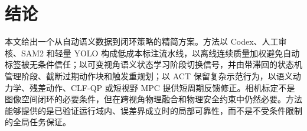 \documentclass[UTF8,a4paper,11pt]{ctexart}
\begin{document}
\section{结论}

本文给出一个从自动语义数据到闭环策略的精简方案。方法以 Codex、人工审核、SAM2 和轻量 YOLO 构成低成本标注流水线，以离线连续质量加权避免自动标签被无条件信任；以可变视角语义状态学习阶段切换信号，并由带滞回的状态机管理阶段、截断过期动作块和触发重规划；以 ACT 保留复杂示范行为，以语义动力学、残差动作、CLF-QP 或短视野 MPC 提供短周期反馈修正。相机标定不是图像空间闭环的必要条件，但在跨视角物理融合和物理安全约束中仍然必要。方法能够提供的是已验证运行域内、误差界成立时的局部可靠性，而不是不受条件限制的全局任务保证。



\end{document}

